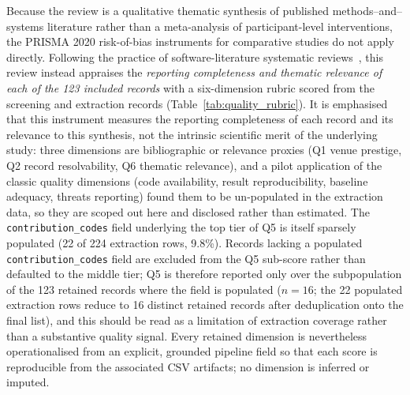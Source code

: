 Because the review is a qualitative thematic synthesis of published
methods--and--systems literature rather than a meta-analysis of participant-level
interventions, the PRISMA 2020 risk-of-bias instruments for comparative studies do
not apply directly. Following the practice of software-literature systematic
reviews~\cite{XiaoWatson2019}, this review instead appraises the \emph{reporting
completeness and thematic relevance of each of the 123 included records} with a
six-dimension rubric scored
from the screening and extraction records (Table~\ref{tab:quality_rubric}). It is
emphasised that this instrument measures the reporting completeness of each record
and its relevance to this synthesis, not the intrinsic scientific merit of the
underlying study: three dimensions are bibliographic or relevance proxies (Q1
venue prestige, Q2 record resolvability, Q6 thematic relevance), and a pilot
application of the classic quality dimensions (code availability, result
reproducibility, baseline adequacy, threats reporting) found them to be
un-populated in the extraction data, so they are scoped out here and disclosed
rather than estimated. The \texttt{contribution\_codes} field underlying the top
tier of Q5 is itself sparsely populated (22 of 224 extraction rows, 9.8\%). Records
lacking a populated \texttt{contribution\_codes} field are excluded from the Q5
sub-score rather than defaulted to the middle tier; Q5 is therefore reported only
over the subpopulation of the 123 retained records where the field is populated
($n=16$; the 22 populated extraction rows reduce to 16 distinct retained records
after deduplication onto the final list), and this should be read as a limitation
of extraction coverage rather than a substantive quality signal. Every retained
dimension is nevertheless operationalised from an explicit, grounded pipeline field
so that each score is reproducible from the associated CSV artifacts; no dimension
is inferred or imputed.

